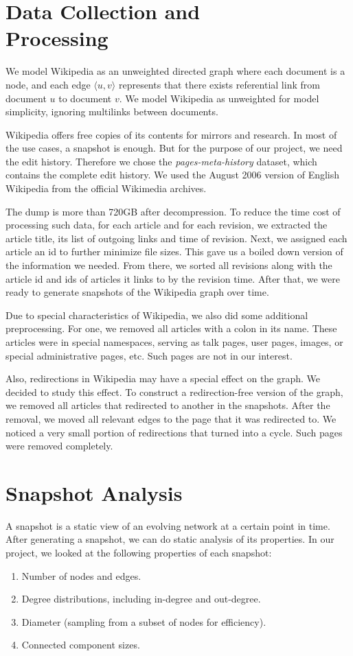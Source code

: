 \documentclass[10pt,twocolumn]{article}
\begin{document}
\section{Data Collection and\\ Processing}
We model Wikipedia as an unweighted directed graph where each document is a node, and each edge $\langle u, v \rangle$ represents that there exists referential link from document $u$ to document $v$. We model Wikipedia as unweighted for model simplicity, ignoring multilinks between documents.

Wikipedia offers free copies of its contents for mirrors and research. In most of the use cases, a snapshot is enough. But for the purpose of our project, we need the edit history. Therefore we chose the {\it pages-meta-history} dataset, which contains the complete edit history. We used the August 2006 version of English Wikipedia from the official Wikimedia archives.

The dump is more than 720GB after decompression. To reduce the time cost of processing such data, for each article and for each revision, we extracted the article title, its list of outgoing links and time of revision. Next, we assigned each article an id to further minimize file sizes. This gave us a boiled down version of the information we needed. From there, we sorted all revisions along with the article id and ids of articles it links to by the revision time. After that, we were ready to generate snapshots of the Wikipedia graph over time.

Due to special characteristics of Wikipedia, we also did some additional preprocessing. For one, we removed all articles with a colon in its name. These articles were in special namespaces, serving as talk pages, user pages, images, or special administrative pages, etc. Such pages are not in our interest.

Also, redirections in Wikipedia may have a special effect on the graph. We decided to study this effect. To construct a redirection-free version of the graph, we removed all articles that redirected to another in the snapshots. After the removal, we moved all relevant edges to the page that it was redirected to. We noticed a very small portion of redirections that turned into a cycle. Such pages were removed completely.

\section{Snapshot Analysis}
A snapshot is a static view of an evolving network at a certain point in time. After generating a snapshot, we can do static analysis of its properties. In our project, we looked at the following properties of each snapshot:
\begin{enumerate}
\item Number of nodes and edges.
\item Degree distributions, including in-degree and out-degree.
\item Diameter (sampling from a subset of nodes for efficiency).
\item Connected component sizes.
\end{enumerate}
\end{document}
